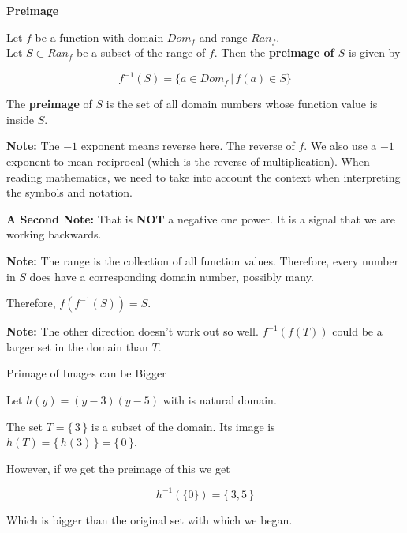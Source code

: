 \documentclass{ximera}
\begin{document}
\begin{definition} \textbf{\textcolor{green!50!black}{Preimage}}

Let $f$ be a function with domain $Dom_f$ and range $Ran_f$. \\
Let $S \subset Ran_f$ be a subset of the range of $f$.  Then the \textbf{preimage of $S$} is given by

\[       f^{-1}(S) = \{   a \in Dom_f  \, | \, f(a) \in S  \}             \]



The \textbf{preimage} of $S$ is the set of all domain numbers whose function value is inside $S$.


\textbf{Note:}  The $-1$ exponent means reverse here. The reverse of $f$.  We also use a $-1$ exponent to mean reciprocal (which is the reverse of multiplication).  When reading mathematics, we need to take into account the context when interpreting the symbols and notation.


\end{definition}

\textbf{A Second Note:} That is \textbf{NOT} a negative one power.  It is a signal that we are working backwards.

\textbf{Note:}  The range is the collection of all function values. Therefore, every number in $S$ does have a corresponding domain number, possibly many.

Therefore, $f(f^{-1}(S)) = S$.


\textbf{Note:}  The other direction doesn't work out so well. $f^{-1}(f(T))$ could be a larger set in the domain than $T$.



\begin{example} Primage of Images can be Bigger


Let $h(y) = (y-3)(y-5)$ with is natural domain. 

The set $T = \{ \, 3 \, \}$ is a subset of the domain.  Its image is $h(T) = \{ \, h(3) \, \} = \{ \, 0 \, \}$.

However, if we get the preimage of this we get


\[
h^{-1}(\{ 0 \}) = \{ \,  3, 5 \,\}
\]

Which is bigger than the original set with which we began.

\end{example}
\end{document}
